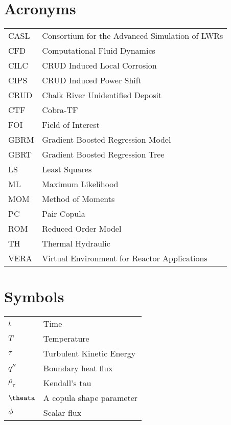 
\section*{Acronyms}
\begin{tabular}{l l}
CASL & Consortium for the Advanced Simulation of LWRs \\
CFD &  Computational Fluid Dynamics \\
CILC & CRUD Induced Local Corrosion \\
CIPS & CRUD Induced Power Shift \\
CRUD & Chalk River Unidentified Deposit \\
CTF &  Cobra-TF \\
FOI &  Field of Interest \\
GBRM & Gradient Boosted Regression Model \\
GBRT & Gradient Boosted Regression Tree \\
LS  &  Least Squares \\
ML  &  Maximum Likelihood \\
MOM &  Method of Moments \\
PC  &  Pair Copula \\
ROM &  Reduced Order Model \\
TH  &  Thermal Hydraulic \\
VERA & Virtual Environment for Reactor Applications \\
\end{tabular}

\section*{Symbols}
\begin{tabular}{l l}
$t$ & Time \\
$T$ & Temperature \\
$\tau$ & Turbulent Kinetic Energy \\
$q''$ & Boundary heat flux \\
$\rho_{\tau}$ & Kendall's tau \\
$\theata$ & A copula shape parameter \\
$\phi$ & Scalar flux \\
\end{tabular}

\pagebreak
